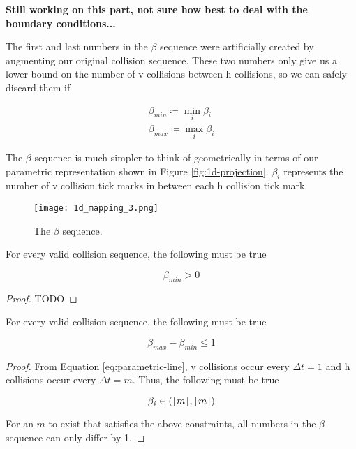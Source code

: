 \textbf{Still working on this part, not sure how best to deal with the boundary conditions...}

The first and last numbers in the $\beta$ sequence were artificially created by augmenting our original collision sequence. These two numbers only give us a lower bound on the number of v collisions between h collisions, so we can safely discard them if 

\begin{definition}
	\begin{align}
		\beta_{min} \coloneqq \min_i \beta_i\\
		\beta_{max} \coloneqq \max_i \beta_i
	\end{align}
\end{definition}

The $\beta$ sequence is much simpler to think of geometrically in terms of our parametric representation shown in Figure \ref{fig:1d-projection}. $\beta_i$ represents the number of v collision tick marks in between each h collision tick mark.

\begin{figure}[H]
  \begin{center}
    \texttt{[image: 1d\_mapping\_3.png]}
  \end{center}
  \vspace{-.2in} %
  \caption{\label{fig:beta-sequence} The $\beta$ sequence.}
\end{figure}

\begin{lemma}\label{lemma:beta_pos}
	For every valid collision sequence, the following must be true

	\begin{equation}
		\beta_{min} > 0
	\end{equation}
\end{lemma}

\begin{proof}
	TODO
\end{proof}

\begin{theorem}\label{thm:beta_exremum}
	For every valid collision sequence, the following must be true
	
	\begin{equation}
		\beta_{max} - \beta_{min} \le 1
	\end{equation}
\end{theorem}

\begin{proof}

From Equation \ref{eq:parametric-line}, v collisions occur every $\Delta t = 1$ and h collisions occur every $\Delta t = m$. Thus, the following must be true

\begin{equation}
	\beta_i \in \paren{\floor{m}, \ceil{m}}
\end{equation}

For an $m$ to exist that satisfies the above constraints, all numbers in the $\beta$ sequence can only differ by 1.

\end{proof}

